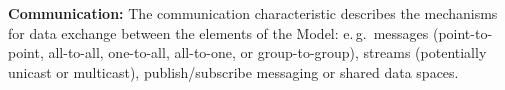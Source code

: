 \documentclass[conference,final]{IEEEtran}
\newcommand{\alnote}[1]{ {\textcolor{blue} { ***andre: #1 }}}
\newcommand{\alnote}[1]{}
\begin{document}

% 




\textbf{Communication:} The communication characteristic describes the
mechanisms for data exchange between the elements of the Model:
e.\,g.\ messages (point-to-point, all-to-all, one-to-all, all-to-one,
or group-to-group), streams (potentially unicast or multicast),
publish/subscribe messaging or shared data spaces.
		
\end{document}
